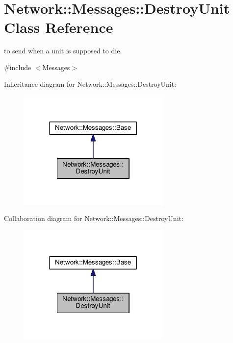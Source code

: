 \hypertarget{class_network_1_1_messages_1_1_destroy_unit}{}\section{Network\+:\+:Messages\+:\+:Destroy\+Unit Class Reference}
\label{class_network_1_1_messages_1_1_destroy_unit}


to send when a unit is supposed to die  




{\ttfamily \#include $<$Messages$>$}



Inheritance diagram for Network\+:\+:Messages\+:\+:Destroy\+Unit\+:
\nopagebreak
\begin{figure}[H]
\begin{center}
\leavevmode
\includegraphics[width=213pt]{class_network_1_1_messages_1_1_destroy_unit__inherit__graph}
\end{center}
\end{figure}


Collaboration diagram for Network\+:\+:Messages\+:\+:Destroy\+Unit\+:
\nopagebreak
\begin{figure}[H]
\begin{center}
\leavevmode
\includegraphics[width=213pt]{class_network_1_1_messages_1_1_destroy_unit__coll__graph}
\end{center}
\end{figure}
